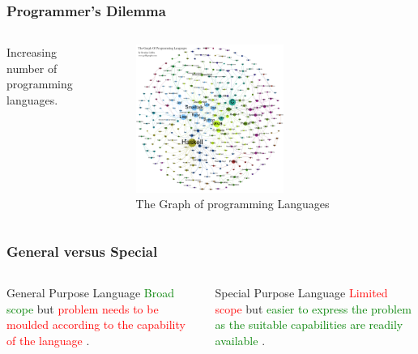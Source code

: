 \documentclass[aspectratio=1610]{beamer}
\begin{document}
\begin{frame}
\frametitle{Programmer's Dilemma}
  \begin{columns}[T]
    \begin{column}{.2\textwidth}
     \begin{block}{}
Increasing number of programming languages.
\href{http://zoom.it/5WN3}{}
    \end{block}
    \end{column}
    \begin{column}{0.8\textwidth}
    \begin{block}{}
\begin{figure}
    \includegraphics[height = 0.6\textwidth, width=0.6\textwidth]{programming-languages_2.png} 
    \caption{The Graph of programming Languages\cite{proglanggraph}}
 \end{figure}   
    \end{block}
    \end{column}
  \end{columns}
\end{frame}

\begin{frame}
 \frametitle{General versus Special}
 \begin{columns}[T]
  \begin{column}{0.5\textwidth}
   \begin{block}{General Purpose Language}
    \textcolor{green}{Broad scope} but \textcolor{red}{problem needs to be moulded according to the capability of the language} \cite{gplwiki}.
   \end{block}
  \end{column}

  \begin{column}{0.5\textwidth}
   \begin{block}{Special Purpose Language}
    \textcolor{red}{Limited scope} but \textcolor{green}{easier to express the problem as the suitable capabilities are readily available} \cite{splwiki}. 
   \end{block}
  \end{column}
 \end{columns}
\end{frame}
\end{document}
